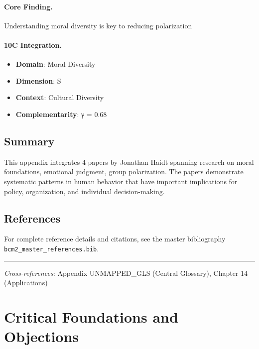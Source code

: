 \paragraph{Core Finding.}
Understanding moral diversity is key to reducing polarization

\paragraph{10C Integration.}
\begin{itemize}[nosep]
  \item \textbf{Domain}: Moral Diversity
  \item \textbf{Dimension}: S
  \item \textbf{Context}: Cultural Diversity
  \item \textbf{Complementarity}: γ = 0.68
\end{itemize}

\subsection{Summary}

This appendix integrates 4 papers by Jonathan Haidt
spanning research on moral foundations, emotional judgment, group polarization.
The papers demonstrate systematic patterns in human behavior that have important
implications for policy, organization, and individual decision-making.

\subsection{References}

For complete reference details and citations, see the master bibliography
\texttt{bcm2\_master\_references.bib}.

\vspace{1em}
\hrule
\vspace{0.5em}

\noindent\textit{Cross-references:}
Appendix UNMAPPED_GLS (Central Glossary), Chapter 14 (Applications)



\section{Critical Foundations and Objections}
\label{sec:hai-foundations}

